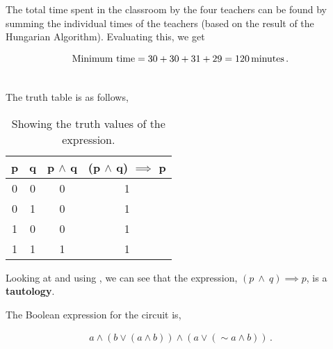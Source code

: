 \begin{subquestions}
\begin{subsubquestions}
		\subsubquestion
		
		The total time spent in the classroom by the four teachers can be found by summing the individual times of the teachers (based on the result of the Hungarian Algorithm). Evaluating this, we get
		
		\begin{align}
			\text{Minimum time} = 30+30+31+29 = 120 \, \text{minutes}\,. \\ \nonumber 
		\end{align}	
	\end{subsubquestions}
	
	
	\subquestion
	
	The truth table is as follows,
	
	\begin{table}[ht]
		\centering
		\begin{tabular}{|c|c|c|c|}
			\hline
			p & q & p $\land$ q & (p $\land$ q) $\implies$ p \\
			\hline
			0 & 0 & 0 & 1 \\
			0 & 1 & 0 & 1 \\
			1 & 0 & 0 & 1 \\
			1 & 1 & 1 & 1 \\
			\hline
		\end{tabular}
		\caption{\label{2015:q2:tab:TrthTab} Showing the truth values of the expression.}
	\end{table}        
	
	Looking at  and using , we can see that the expression, $(p \: \land \: q) \implies p$, is a \textbf{tautology}.  \\
	
	
	\subquestion
	
	\begin{subsubquestions}
		
		\subsubquestion
		
		The Boolean expression for the circuit is,
		
		\begin{align}
			a \land (b \lor (a \land b)) \land (a \lor (\sim a \land b))\,.
		\end{align}	
		

\end{subsubquestions}
\end{subquestions}
